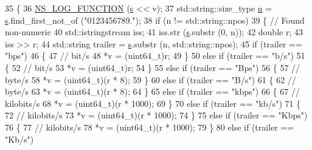 \begin{DoxyCode}
35 \{
36   \hyperlink{log-macros-disabled_8h_a90b90d5bad1f39cb1b64923ea94c0761}{NS\_LOG\_FUNCTION} (\hyperlink{generate__test__data__lte__sinr_8m_ad83eeb3a142285d1243a08c6b7026df8}{s} << v);
37   std::string::size\_type \hyperlink{namespacesample-rng-plot_aeb5ee5c431e338ef39b7ac5431242e1d}{n} = \hyperlink{generate__test__data__lte__sinr_8m_ad83eeb3a142285d1243a08c6b7026df8}{s}.find\_first\_not\_of (\textcolor{stringliteral}{"0123456789."});
38   \textcolor{keywordflow}{if} (n != std::string::npos)
39     \{ \textcolor{comment}{// Found non-numeric}
40       std::istringstream iss;
41       iss.str (\hyperlink{generate__test__data__lte__sinr_8m_ad83eeb3a142285d1243a08c6b7026df8}{s}.substr (0, n));
42       \textcolor{keywordtype}{double} r;
43       iss >> r;
44       std::string trailer = \hyperlink{generate__test__data__lte__sinr_8m_ad83eeb3a142285d1243a08c6b7026df8}{s}.substr (n, std::string::npos);
45       \textcolor{keywordflow}{if} (trailer == \textcolor{stringliteral}{"bps"})
46         \{
47           \textcolor{comment}{// bit/s}
48           *v = (uint64\_t)r;
49         \}
50       \textcolor{keywordflow}{else} \textcolor{keywordflow}{if} (trailer == \textcolor{stringliteral}{"b/s"})
51         \{
52           \textcolor{comment}{// bit/s}
53           *v = (uint64\_t)r;
54         \}
55       \textcolor{keywordflow}{else} \textcolor{keywordflow}{if} (trailer == \textcolor{stringliteral}{"Bps"})
56         \{
57           \textcolor{comment}{// byte/s}
58           *v = (uint64\_t)(r * 8);
59         \}
60       \textcolor{keywordflow}{else} \textcolor{keywordflow}{if} (trailer == \textcolor{stringliteral}{"B/s"})
61         \{
62           \textcolor{comment}{// byte/s}
63           *v = (uint64\_t)(r * 8);
64         \}
65       \textcolor{keywordflow}{else} \textcolor{keywordflow}{if} (trailer == \textcolor{stringliteral}{"kbps"})
66         \{
67           \textcolor{comment}{// kilobits/s}
68           *v = (uint64\_t)(r * 1000);
69         \}
70       \textcolor{keywordflow}{else} \textcolor{keywordflow}{if} (trailer == \textcolor{stringliteral}{"kb/s"})
71         \{
72           \textcolor{comment}{// kilobits/s}
73           *v = (uint64\_t)(r * 1000);
74         \}
75       \textcolor{keywordflow}{else} \textcolor{keywordflow}{if} (trailer == \textcolor{stringliteral}{"Kbps"})
76         \{
77           \textcolor{comment}{// kilobits/s}
78           *v = (uint64\_t)(r * 1000);
79         \}
80       \textcolor{keywordflow}{else} \textcolor{keywordflow}{if} (trailer == \textcolor{stringliteral}{"Kb/s"})

\end{DoxyCode}
